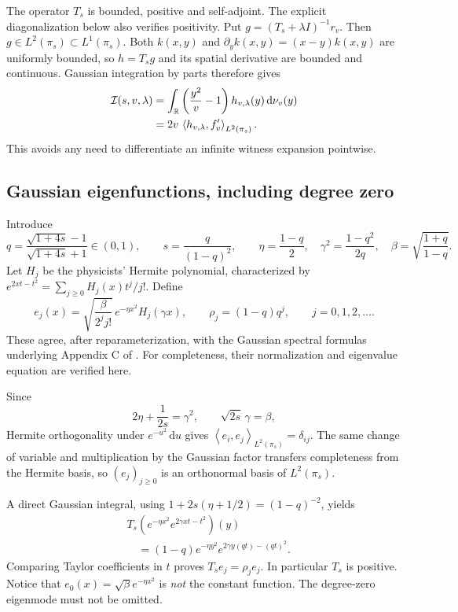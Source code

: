\documentclass[11pt]{article}
\theoremstyle{remark}
\newcommand{\R}{\mathbb R}
\newcommand{\Ical}{\mathcal I}
\newcommand{\ip}[2]{\left\langle #1,#2\right\rangle}
\newcommand{\dd}{\,\mathrm d}
\begin{document}
The operator $T_s$ is bounded, positive and self-adjoint. The explicit diagonalization below also verifies positivity. Put $g=(T_s+\lambda I)^{-1}r_v$. Then $g\in L^2(\pi_s)\subset L^1(\pi_s)$. Both $k(x,y)$ and $\partial_y k(x,y)=(x-y)k(x,y)$ are uniformly bounded, so $h=T_sg$ and its spatial derivative are bounded and continuous. Gaussian integration by parts therefore gives
\begin{align}
 \Ical(s,v,\lambda)
 &=\int_\R \left(\frac{y^2}{v}-1\right)h_{v,\lambda}(y)\dd\nu_v(y)\notag\\
 &=2v\,\ip{h_{v,\lambda}}{f_v'}_{L^2(\pi_s)}.\label{eq:ibp}
\end{align}
This avoids any need to differentiate an infinite witness expansion pointwise.

\subsection{Gaussian eigenfunctions, including degree zero}
Introduce
\begin{equation}\label{eq:parameters}
 q=\frac{\sqrt{1+4s}-1}{\sqrt{1+4s}+1}\in(0,1),\qquad
 s=\frac{q}{(1-q)^2},\qquad
 \eta=\frac{1-q}{2},\quad
 \gamma^2=\frac{1-q^2}{2q},\quad
 \beta=\sqrt{\frac{1+q}{1-q}}.
\end{equation}
Let $H_j$ be the physicists' Hermite polynomial, characterized by
$e^{2xt-t^2}=\sum_{j\ge0}H_j(x)t^j/j!$.
Define
\begin{equation}\label{eq:eigenfunctions}
 e_j(x)=\sqrt{\frac{\beta}{2^j j!}}\,e^{-\eta x^2}H_j(\gamma x),
 \qquad \rho_j=(1-q)q^j,\qquad j=0,1,2,\ldots.
\end{equation}
These agree, after reparameterization, with the Gaussian spectral formulas underlying Appendix C of \cite{chen}. For completeness, their normalization and eigenvalue equation are verified here.

Since
\[
 2\eta+\frac1{2s}=\gamma^2,
 \qquad \sqrt{2s}\,\gamma=\beta,
\]
Hermite orthogonality under $e^{-u^2}\dd u$ gives
$\ip{e_i}{e_j}_{L^2(\pi_s)}=\delta_{ij}$.
The same change of variable and multiplication by the Gaussian factor transfers completeness from the Hermite basis, so $(e_j)_{j\ge0}$ is an orthonormal basis of $L^2(\pi_s)$.

A direct Gaussian integral, using
$1+2s(\eta+1/2)=(1-q)^{-2}$, yields
\begin{align*}
 &T_s\!\left(e^{-\eta x^2}e^{2\gamma xt-t^2}\right)(y)\\
 &\hspace{12pt}=(1-q)e^{-\eta y^2}e^{2\gamma y(qt)-(qt)^2}.
\end{align*}
Comparing Taylor coefficients in $t$ proves $T_s e_j=\rho_j e_j$.
In particular $T_s$ is positive. Notice that $e_0(x)=\sqrt\beta e^{-\eta x^2}$ is \emph{not} the constant function. The degree-zero eigenmode must not be omitted.
\end{document}
